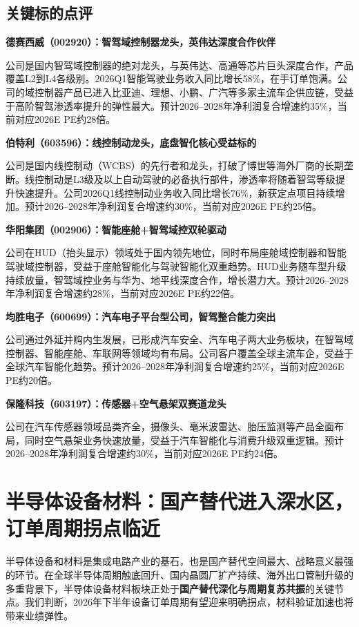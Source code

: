 \subsection{关键标的点评}

\textbf{德赛西威（002920）：智驾域控制器龙头，英伟达深度合作伙伴}

公司是国内智驾域控制器的绝对龙头，与英伟达、高通等芯片巨头深度合作，产品覆盖L2到L4各级别。2026Q1智能驾驶业务收入同比增长58\%，在手订单饱满。公司的域控制器产品已进入比亚迪、理想、小鹏、广汽等多家主流车企供应链，受益于高阶智驾渗透率提升的弹性最大。预计2026--2028年净利润复合增速约35\%，当前对应2026E PE约28倍。

\textbf{伯特利（603596）：线控制动龙头，底盘智化核心受益标的}

公司是国内线控制动（WCBS）的先行者和龙头，打破了博世等海外厂商的长期垄断。线控制动是L3级及以上自动驾驶的必备执行部件，渗透率将随着智驾等级提升快速提升。公司2026Q1线控制动业务收入同比增长76\%，新获定点项目持续增加。预计2026--2028年净利润复合增速约30\%，当前对应2026E PE约25倍。

\textbf{华阳集团（002906）：智能座舱+智驾域控双轮驱动}

公司在HUD（抬头显示）领域处于国内领先地位，同时布局座舱域控制器和智能驾驶域控制器，受益于座舱智能化与驾驶智能化双重趋势。HUD业务随车型升级持续放量，智驾域控业务与华为、地平线深度合作，增长潜力大。预计2026--2028年净利润复合增速约28\%，当前对应2026E PE约22倍。

\textbf{均胜电子（600699）：汽车电子平台型公司，智驾整合能力突出}

公司通过外延并购内生发展，已形成汽车安全、汽车电子两大业务板块，在智驾域控制器、智能座舱、车联网等领域均有布局。公司客户覆盖全球主流车企，受益于全球汽车智能化趋势。预计2026--2028年净利润复合增速约25\%，当前对应2026E PE约20倍。

\textbf{保隆科技（603197）：传感器+空气悬架双赛道龙头}

公司在汽车传感器领域品类齐全，摄像头、毫米波雷达、胎压监测等产品全面布局，同时空气悬架业务快速放量，受益于汽车智能化与消费升级双重逻辑。预计2026--2028年净利润复合增速约30\%，当前对应2026E PE约24倍。

\section{半导体设备材料：国产替代进入深水区，订单周期拐点临近}

半导体设备和材料是集成电路产业的基石，也是国产替代空间最大、战略意义最强的环节。在全球半导体周期触底回升、国内晶圆厂扩产持续、海外出口管制升级的多重背景下，半导体设备材料板块正处于\textbf{国产替代深化与周期复苏共振}的关键节点。我们判断，2026年下半年设备订单周期有望迎来明确拐点，材料验证加速也将带来业绩弹性。

